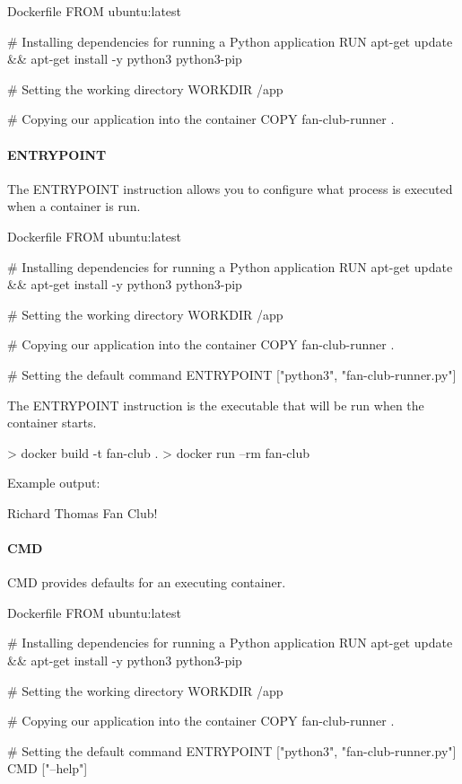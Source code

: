 \documentclass{csse4400}
\begin{document}
\begin{code}[language=docker,numbers=none]{Dockerfile}
FROM ubuntu:latest

# Installing dependencies for running a Python application
RUN apt-get update && apt-get install -y python3 python3-pip

# Setting the working directory
WORKDIR /app

# Copying our application into the container
COPY fan-club-runner .
\end{code}


\paragraph{ENTRYPOINT}
The ENTRYPOINT instruction allows you to configure what process is executed when a container is run.

\begin{code}[language=docker,numbers=none]{Dockerfile}
FROM ubuntu:latest

# Installing dependencies for running a Python application
RUN apt-get update && apt-get install -y python3 python3-pip

# Setting the working directory
WORKDIR /app

# Copying our application into the container
COPY fan-club-runner .

# Setting the default command
ENTRYPOINT ["python3", "fan-club-runner.py"]
\end{code}

The ENTRYPOINT instruction is the executable that will be run when the container starts.

\begin{code}[language=shell,numbers=none]{}
> docker build -t fan-club .
> docker run --rm fan-club
\end{code}

Example output:

\begin{code}[language=shell,numbers=none]{}
Richard Thomas Fan Club!
\end{code}

\paragraph{CMD}
CMD provides defaults for an executing container.

\begin{code}[language=docker,numbers=none]{Dockerfile}
FROM ubuntu:latest

# Installing dependencies for running a Python application
RUN apt-get update && apt-get install -y python3 python3-pip

# Setting the working directory
WORKDIR /app

# Copying our application into the container
COPY fan-club-runner .

# Setting the default command
ENTRYPOINT ["python3", "fan-club-runner.py"]
CMD ["--help"]
\end{code}
\end{document}
